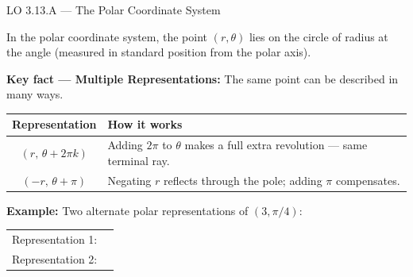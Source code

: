 \documentclass[10pt]{article}
\begin{document}
\begin{notesbox}{LO 3.13.A --- The Polar Coordinate System}

In the polar coordinate system, the point $(r,\theta)$ lies on the circle of
radius \underline{\hspace{1cm}} at the angle \underline{\hspace{1cm}} (measured
in standard position from the polar axis).

\vspace{6pt}
\textbf{Key fact --- Multiple Representations:} The same point can be described
in many ways.

\vspace{4pt}
\renewcommand{\arraystretch}{1.6}
\begin{tabular}{|c|l|}
\hline
\textbf{Representation} & \textbf{How it works} \\
\hline
$(r,\, \theta + 2\pi k)$ & Adding $2\pi$ to $\theta$ makes a full extra revolution --- same terminal ray. \\
\hline
$(-r,\, \theta + \pi)$ & Negating $r$ reflects through the pole; adding $\pi$ compensates. \\
\hline
\end{tabular}

\vspace{8pt}
\textbf{Example:} Two alternate polar representations of $(3,\pi/4)$:

\vspace{4pt}
\begin{tabular}{ll}
Representation 1: & \underline{\hspace{4cm}} \\[6pt]
Representation 2: & \underline{\hspace{4cm}} \\
\end{tabular}

\end{notesbox}

\vspace{0.08in}
\end{document}
